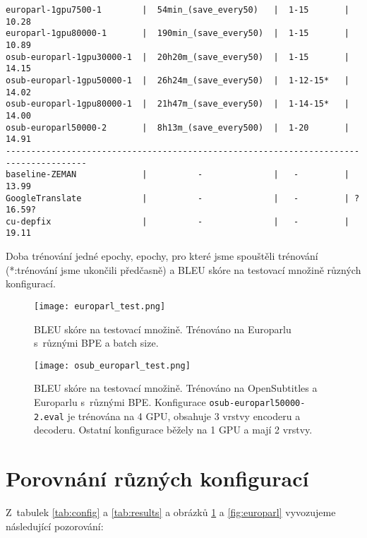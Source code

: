 \documentclass[a4]{article}
\begin{document}
\begin{table}[htpb]
\begin{verbatim}
europarl-1gpu7500-1        |  54min_(save_every50)   |  1-15       |  10.28
europarl-1gpu80000-1       |  190min_(save_every50)  |  1-15       |  10.89
osub-europarl-1gpu30000-1  |  20h20m_(save_every50)  |  1-15       |  14.15
osub-europarl-1gpu50000-1  |  26h24m_(save_every50)  |  1-12-15*   |  14.02
osub-europarl-1gpu80000-1  |  21h47m_(save_every50)  |  1-14-15*   |  14.00
osub-europarl50000-2       |  8h13m_(save_every500)  |  1-20       |  14.91
--------------------------------------------------------------------------------------
baseline-ZEMAN             |          -              |   -         |  13.99
GoogleTranslate            |          -              |   -         | ?16.59?
cu-depfix                  |          -              |   -         |  19.11
\end{verbatim}
\caption{Doba trénování jedné epochy, epochy, pro které jsme spouštěli
trénování (*:trénování jsme ukončili předčasně) a BLEU skóre na testovací množině různých konfigurací.}
\label{tab:results}
\end{table}

\begin{figure}[p]
\centering
  \texttt{[image: europarl\_test.png]}
    \caption{BLEU skóre na testovací množině. Trénováno na Europarlu
	s~různými BPE a batch size.}
  \label{fig:europarl}
  \texttt{[image: osub\_europarl\_test.png]}
    \caption{BLEU skóre na testovací množině. Trénováno na OpenSubtitles a Europarlu
	s~různými BPE. Konfigurace \texttt{osub-europarl50000-2.eval} je trénována
	na 4 GPU, obsahuje 3 vrstvy encoderu a decoderu. Ostatní konfigurace běžely
	na 1 GPU a mají 2 vrstvy.}
  \label{fig:osub}
\end{figure}



\section{Porovnání různých konfigurací}

Z~tabulek \ref{tab:config} a \ref{tab:results} a obrázků 
\ref{fig:osub} a \ref{fig:europarl} vyvozujeme následující pozorování:
\end{document}
